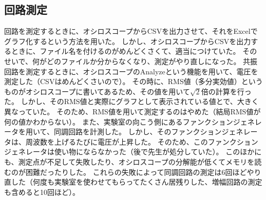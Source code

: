 \documentclass[report.tex]{subfiles}
\begin{document}
\subsection{回路測定}

回路を測定するときに、オシロスコープからCSVを出力させて、それをExcelでグラフ化するという方法を用いた。
しかし、オシロスコープからCSVを出力するときに、ファイル名を付けるのがめんどくさくて、適当につけていた。
そのせいで、何がどのファイルか分からなくなり、測定がやり直しになった。
共振回路を測定するときに、オシロスコープのAnalyzeという機能を用いて、電圧を測定した（CSVはめんどくさいので）。
その時に、RMS値（多分実効値）というものがオシロスコープに書いてあるため、その値を用いて\(\sqrt{2}\)倍の計算を行った。
しかし、そのRMS値と実際にグラフとして表示されている値とで、大きく異なっていた。
そのため、RMS値を用いて測定するのはやめた（結局RMS値が何の値かわからない）。
また、実験室の向こう側にあるファンクションジェネレータを用いて、同調回路を計測した。
しかし、そのファンクションジェネレータは、周波数を上げるたびに電圧が上昇した。
そのため、このファンクションジェネレータは使い物にならなかった（後で先生が処分していた）。
このほかにも、測定点が不足して失敗したり、オシロスコープの分解能が低くてメモリを読むのが困難だったりした。
これらの失敗によって同調回路の測定は6回ほどやり直した（何度も実験室を使わせてもらってたくさん居残りした、増幅回路の測定も含めると10回ほど）。
\end{document}
